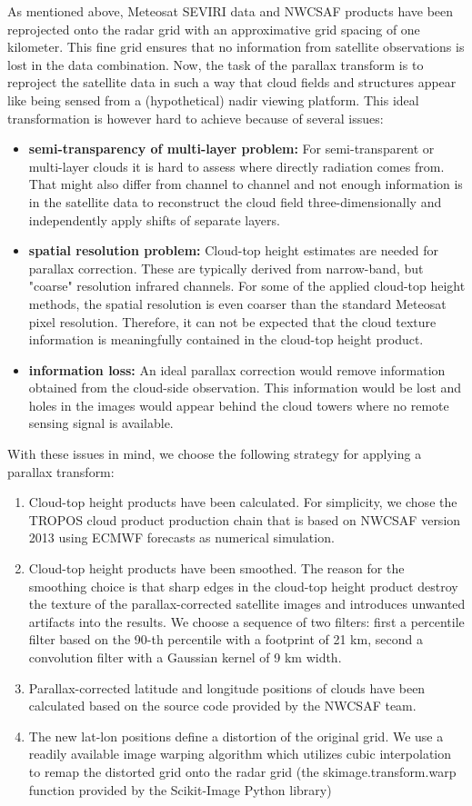 As mentioned above, Meteosat SEVIRI data and NWCSAF products have been reprojected onto the radar grid with an approximative grid spacing of one kilometer. This fine grid ensures that no information from satellite observations is lost in the data combination. Now, the task of the parallax transform is to reproject the satellite data in such a way that cloud fields and structures appear like being sensed from a (hypothetical) nadir viewing platform. This ideal transformation is however hard to achieve because of several issues:
\begin{itemize}
\item \textbf{semi-transparency of multi-layer problem:} For semi-transparent or multi-layer clouds it is hard to assess where directly radiation comes from. That might also differ from channel to channel and not enough information is in the satellite data to reconstruct the cloud field three-dimensionally and independently apply shifts of separate layers.
\item \textbf{spatial resolution problem:} Cloud-top height estimates are needed for parallax correction. These are typically derived from narrow-band, but "coarse" resolution infrared channels. For some of the applied cloud-top height methods, the spatial resolution is even coarser than the standard Meteosat pixel resolution. Therefore, it can not be expected that the cloud texture information is meaningfully contained in the cloud-top height product. 
\item \textbf{information loss:} An ideal parallax correction would remove information obtained from the cloud-side observation. This information would be lost and holes in the images would appear behind the cloud towers where no remote sensing signal is available.
\end{itemize}
With these issues in mind, we choose the following strategy for applying a parallax transform:
\begin{enumerate}
\item Cloud-top height products have been calculated. For simplicity, we chose the TROPOS cloud product production chain that is based on NWCSAF version 2013 using ECMWF forecasts as numerical simulation.
\item Cloud-top height products have been smoothed. The reason for the smoothing choice is that sharp edges in the cloud-top height product destroy the texture of the parallax-corrected satellite images and introduces unwanted artifacts into the results. We choose a sequence of two filters: first a percentile filter based on the 90-th percentile with a footprint of 21 km, second a convolution filter with a Gaussian kernel of 9 km width.
\item Parallax-corrected latitude and longitude positions of clouds have been calculated based on the source code provided by the NWCSAF team.
\item The new lat-lon positions define a distortion of the original grid. We use a readily available image warping algorithm which utilizes cubic interpolation to remap the distorted grid onto the radar grid (the skimage.transform.warp function provided by the Scikit-Image Python library)  
\end{enumerate}

